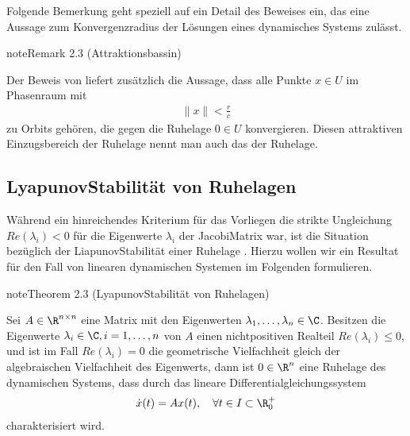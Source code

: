 \documentclass[letterpaper,10pt,english]{jupyterBook}
\begin{document}
\sphinxAtStartPar
Folgende Bemerkung geht speziell auf ein Detail des Beweises ein, das eine Aussage zum Konvergenzradius der Lösungen eines dynamisches Systems zulässt.
\label{ode_stability/ruhelagen:remark-6}
\begin{sphinxadmonition}{note}{Remark 2.3 (Attraktionsbassin)}



\sphinxAtStartPar
Der Beweis von {\hyperref[\detokenize{ode_stability/ruhelagen:theorem:stabilitaet_asymptotisch_allg}]{}} liefert zusätzlich die Aussage, dass alle Punkte \(x\in U\) im Phasenraum mit
\begin{equation*}
\begin{split}\|x\| < \frac{r}{c}\end{split}
\end{equation*}
\sphinxAtStartPar
zu Orbits gehören, die gegen die Ruhelage \(0 \in U\) konvergieren.
Diesen attraktiven Einzugsbereich der Ruhelage nennt man auch das  der Ruhelage.
\end{sphinxadmonition}


\subsection{Lyapunov\sphinxhyphen{}Stabilität von Ruhelagen}
\label{\detokenize{ode_stability/ruhelagen:lyapunov-stabilitat-von-ruhelagen}}
\sphinxAtStartPar
Während ein hinreichendes Kriterium für das Vorliegen  die strikte Ungleichung \(Re(\lambda_i)<0\) für die Eigenwerte \(\lambda_i\) der Jacobi\sphinxhyphen{}Matrix war, ist die Situation bezüglich der Liapunov\sphinxhyphen{}Stabilität einer Ruhelage .
Hierzu wollen wir ein Resultat für den Fall von linearen dynamischen Systemen im Folgenden formulieren.
\label{ode_stability/ruhelagen:theorem:stabilitaet_lyapunov_linear}
\begin{sphinxadmonition}{note}{Theorem 2.3 (Lyapunov\sphinxhyphen{}Stabilität von Ruhelagen)}



\sphinxAtStartPar
Sei \(A\in \R^{n\times n}\) eine Matrix mit den Eigenwerten \(\lambda_1,\dots, \lambda_n\in \C\).
Besitzen die Eigenwerte \(\lambda_i \in \C, i=1,\ldots,n\) von \(A\) einen nicht\sphinxhyphen{}positiven Realteil \(Re(\lambda_i) \leq 0\), und ist im Fall \(Re(\lambda_i)=0\) die geometrische Vielfachheit gleich der algebraischen Vielfachheit des Eigenwerts, dann ist \(0\in \R^n\) eine  Ruhelage des dynamischen Systems, dass durch das lineare Differentialgleichungssystem
\begin{equation*}
\begin{split}\dot{x}(t) = Ax(t), \quad  \forall t \in I \subset \R^+_0\end{split}
\end{equation*}
\sphinxAtStartPar
charakterisiert wird.
\end{sphinxadmonition}
\end{document}
